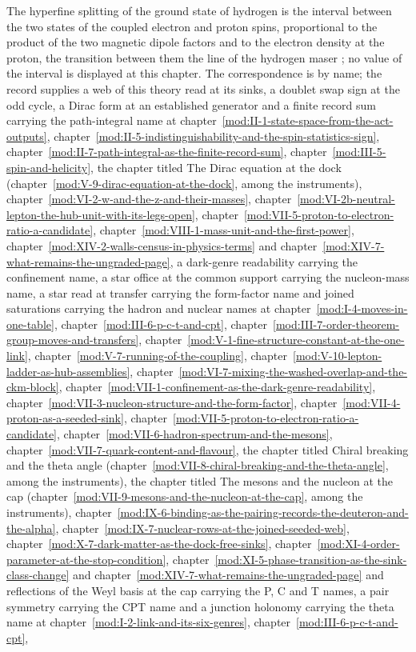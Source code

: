 \begin{chbridge}
The hyperfine splitting of the ground state of hydrogen is the interval between the two states of the coupled electron and proton spins, proportional to the product of the two magnetic dipole factors and to the electron density at the proton, the transition between them the line of the hydrogen maser \cite{Fermi1930,Ramsey1965}; no value of the interval is displayed at this chapter. The correspondence is by name; the record supplies a web of this theory read at its sinks, a doublet swap sign at the odd cycle, a Dirac form at an established generator and a finite record sum carrying the path-integral name at chapter~\ref{mod:II-1-state-space-from-the-act-outputs}, chapter~\ref{mod:II-5-indistinguishability-and-the-spin-statistics-sign}, chapter~\ref{mod:II-7-path-integral-as-the-finite-record-sum}, chapter~\ref{mod:III-5-spin-and-helicity}, the chapter titled The Dirac equation at the dock (chapter~\ref{mod:V-9-dirac-equation-at-the-dock}, among the instruments), chapter~\ref{mod:VI-2-w-and-the-z-and-their-masses}, chapter~\ref{mod:VI-2b-neutral-lepton-the-hub-unit-with-its-legs-open}, chapter~\ref{mod:VII-5-proton-to-electron-ratio-a-candidate}, chapter~\ref{mod:VIII-1-mass-unit-and-the-first-power}, chapter~\ref{mod:XIV-2-walls-census-in-physics-terms} and chapter~\ref{mod:XIV-7-what-remains-the-ungraded-page}, a dark-genre readability carrying the confinement name, a star office at the common support carrying the nucleon-mass name, a star read at transfer carrying the form-factor name and joined saturations carrying the hadron and nuclear names at chapter~\ref{mod:I-4-moves-in-one-table}, chapter~\ref{mod:III-6-p-c-t-and-cpt}, chapter~\ref{mod:III-7-order-theorem-group-moves-and-transfers}, chapter~\ref{mod:V-1-fine-structure-constant-at-the-one-link}, chapter~\ref{mod:V-7-running-of-the-coupling}, chapter~\ref{mod:V-10-lepton-ladder-as-hub-assemblies}, chapter~\ref{mod:VI-7-mixing-the-washed-overlap-and-the-ckm-block}, chapter~\ref{mod:VII-1-confinement-as-the-dark-genre-readability}, chapter~\ref{mod:VII-3-nucleon-structure-and-the-form-factor}, chapter~\ref{mod:VII-4-proton-as-a-seeded-sink}, chapter~\ref{mod:VII-5-proton-to-electron-ratio-a-candidate}, chapter~\ref{mod:VII-6-hadron-spectrum-and-the-mesons}, chapter~\ref{mod:VII-7-quark-content-and-flavour}, the chapter titled Chiral breaking and the theta angle (chapter~\ref{mod:VII-8-chiral-breaking-and-the-theta-angle}, among the instruments), the chapter titled The mesons and the nucleon at the cap (chapter~\ref{mod:VII-9-mesons-and-the-nucleon-at-the-cap}, among the instruments), chapter~\ref{mod:IX-6-binding-as-the-pairing-records-the-deuteron-and-the-alpha}, chapter~\ref{mod:IX-7-nuclear-rows-at-the-joined-seeded-web}, chapter~\ref{mod:X-7-dark-matter-as-the-dock-free-sinks}, chapter~\ref{mod:XI-4-order-parameter-at-the-stop-condition}, chapter~\ref{mod:XI-5-phase-transition-as-the-sink-class-change} and chapter~\ref{mod:XIV-7-what-remains-the-ungraded-page} and reflections of the Weyl basis at the cap carrying the P, C and T names, a pair symmetry carrying the CPT name and a junction holonomy carrying the theta name at chapter~\ref{mod:I-2-link-and-its-six-genres}, chapter~\ref{mod:III-6-p-c-t-and-cpt}, 
\end{chbridge}
